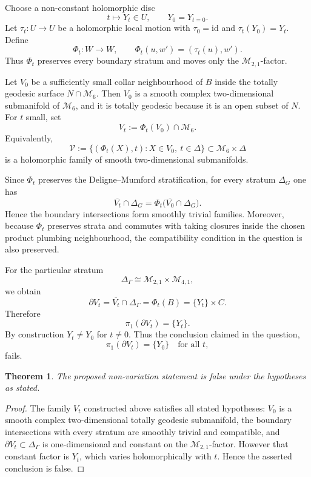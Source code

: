 \documentclass[11pt]{article}
\newtheorem{theorem}{Theorem}
\begin{document}
Choose a non-constant holomorphic disc
\[
 t\longmapsto Y_t\in U,\qquad Y_0=Y_{t=0}.
\]
Let \(\tau_t:U\to U\) be a holomorphic local motion with
\(\tau_0=\mathrm{id}\) and \(\tau_t(Y_0)=Y_t\).  Define
\[
 \Phi_t:W\to W,\qquad \Phi_t(u,w')=(\tau_t(u),w').
\]
Thus \(\Phi_t\) preserves every boundary stratum and moves only the
\(\mathcal M_{2,1}\)-factor.

Let \(V_0\) be a sufficiently small collar neighbourhood of \(B\) inside
the totally geodesic surface \(N\cap \mathcal M_6\).  Then \(V_0\) is a
smooth complex two-dimensional submanifold of \(\mathcal M_6\), and it is
totally geodesic because it is an open subset of \(N\).  For \(t\) small,
set
\[
 V_t:=\Phi_t(V_0)\cap \mathcal M_6.
\]
Equivalently,
\[
 \mathcal V:=\{(\Phi_t(X),t):X\in V_0,\ t\in \Delta\}
 \subset \mathcal M_6\times \Delta
\]
is a holomorphic family of smooth two-dimensional submanifolds.

Since \(\Phi_t\) preserves the Deligne--Mumford stratification, for every
stratum \(\Delta_G\) one has
\[
 \overline{V_t}\cap \Delta_G
 =
 \Phi_t\bigl(\overline{V_0}\cap \Delta_G\bigr).
\]
Hence the boundary intersections form smoothly trivial families.  Moreover,
because \(\Phi_t\) preserves strata and commutes with taking closures inside
the chosen product plumbing neighbourhood, the compatibility condition in
the question is also preserved.

For the particular stratum
\[
 \Delta_\Gamma\cong \mathcal M_{2,1}\times \mathcal M_{4,1},
\]
we obtain
\[
 \partial V_t
 =
 \overline{V_t}\cap \Delta_\Gamma
 =
 \Phi_t(B)
 =
 \{Y_t\}\times C.
\]
Therefore
\[
 \pi_1(\partial V_t)=\{Y_t\}.
\]
By construction \(Y_t\neq Y_0\) for \(t\neq 0\).  Thus the conclusion
claimed in the question,
\[
 \pi_1(\partial V_t)=\{Y_0\}\quad\text{for all }t,
\]
fails.

\begin{theorem}
The proposed non-variation statement is false under the hypotheses as
stated.
\end{theorem}

\begin{proof}
The family \(V_t\) constructed above satisfies all stated hypotheses: \(V_0\)
is a smooth complex two-dimensional totally geodesic submanifold, the
boundary intersections with every stratum are smoothly trivial and
compatible, and \(\partial V_t\subset \Delta_\Gamma\) is one-dimensional and
constant on the \(\mathcal M_{2,1}\)-factor.  However that constant factor
is \(Y_t\), which varies holomorphically with \(t\).  Hence the asserted
conclusion is false.
\end{proof}
\end{document}
